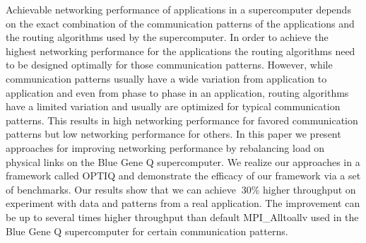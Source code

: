 Achievable networking performance of applications in a supercomputer depends on the exact combination of the communication patterns of the applications and the routing algorithms used by the supercomputer. In order to achieve the highest networking performance for the applications the routing algorithms need to be designed optimally for those communication patterns. However, while communication patterns usually have a wide variation from application to application and even from phase to phase in an application, routing algorithms have a limited variation and usually are optimized for typical communication patterns. This results in high networking performance for favored communication patterns but low networking performance for others. In this paper we present approaches for improving networking performance by rebalancing load on physical links on the Blue Gene Q supercomputer. We realize our approaches in a framework called OPTIQ and demonstrate the efficacy of our framework via a set of benchmarks. Our results show that we can achieve $~$30\% higher throughput on experiment with data and patterns from a real application. The improvement can be up to several times higher throughput than default MPI\_Alltoallv used in the Blue Gene Q supercomputer for certain communication patterns.
